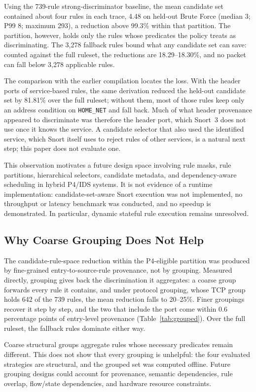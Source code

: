 \documentclass{article}
\begin{document}
Using the 739-rule strong-discriminator baseline, the mean candidate set
contained about four rules in each trace, 4.48 on held-out Brute Force
(median 3; P99 8; maximum 293), a reduction above 99.3\% within that
partition. The partition, however, holds only the rules whose predicates the
policy treats as discriminating. The 3,278 fallback rules bound what any
candidate set can save: counted against the full ruleset, the reductions are
18.29--18.30\%, and no packet can fall below 3,278 applicable rules.

The comparison with the earlier compilation locates the loss. With the
header ports of service-based rules, the same derivation reduced the
held-out candidate set by 81.81\% over the full ruleset; without them, most
of those rules keep only an address condition on \texttt{HOME\_NET} and fall
back. Much of what header provenance appeared to discriminate was therefore
the header port, which Snort~3 does not use once it knows the service. A
candidate selector that also used the identified service, which Snort itself
uses to reject rules of other services, is a natural next step; this paper
does not evaluate one.

This observation motivates a future design space involving rule masks,
rule partitions, hierarchical selectors, candidate metadata, and
dependency-aware scheduling in hybrid P4/IDS systems. It is not evidence of
a runtime implementation: candidate-set-aware Snort execution was not
implemented, no throughput or latency benchmark was conducted, and no
speedup is demonstrated. In particular, dynamic stateful rule execution
remains unresolved.
\subsection{Why Coarse Grouping Does Not Help}
The candidate-rule-space reduction within the P4-eligible partition was
produced by fine-grained entry-to-source-rule provenance, not by grouping.
Measured directly, grouping gives back the discrimination it aggregates: a
coarse group forwards every rule it contains, and under protocol grouping,
whose TCP group holds 642 of the 739 rules, the mean reduction falls to
20--25\%. Finer groupings recover it step by step, and the two that include
the port come within 0.6 percentage points of entry-level provenance
(Table~\ref{tab:grouped}). Over the full ruleset, the fallback rules dominate
either way.

Coarse structural groups aggregate rules whose necessary predicates remain
different. This does not show that every grouping is unhelpful: the four
evaluated strategies are structural, and the grouped set was computed
offline. Future grouping designs could account for provenance, semantic
dependencies, rule overlap, flow/state dependencies, and hardware resource
constraints.
\end{document}
